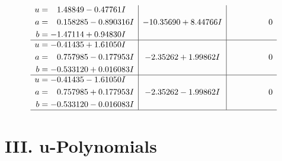 \documentclass[1p]{elsarticle_modified}
\theoremstyle{definition}
\begin{document}
$$\begin{array}{c|c|c}
\begin{aligned}
u &= \phantom{-}1.48849 - 0.47761 I \\
a &= \phantom{-}0.158285 - 0.890316 I \\
b &= -1.47114 + 0.94830 I\end{aligned}
 & -10.35690 + 8.44766 I & \phantom{-0.000000 } 0 \\ \hline\begin{aligned}
u &= -0.41435 + 1.61050 I \\
a &= \phantom{-}0.757985 - 0.177953 I \\
b &= -0.533120 + 0.016083 I\end{aligned}
 & -2.35262 + 1.99862 I & \phantom{-0.000000 } 0 \\ \hline\begin{aligned}
u &= -0.41435 - 1.61050 I \\
a &= \phantom{-}0.757985 + 0.177953 I \\
b &= -0.533120 - 0.016083 I\end{aligned}
 & -2.35262 - 1.99862 I & \phantom{-0.000000 } 0\\
 \hline 
 \end{array}$$\newpage
\newpage\renewcommand{\arraystretch}{1}
\centering \section*{ III. u-Polynomials}
\end{document}
